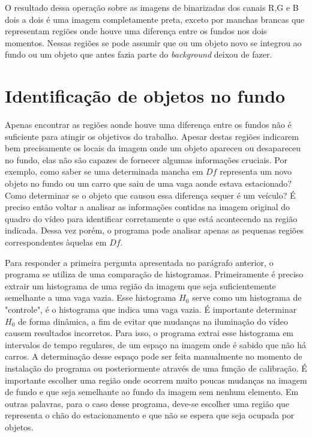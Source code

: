      O resultado dessa operação sobre as imagens de binarizadas dos canais R,G e B dois a dois é uma imagem completamente preta, exceto por manchas brancas que representam regiões onde houve uma diferença entre os fundos nos dois momentos. Nessas regiões se pode assumir que ou um objeto novo se integrou ao fundo ou um objeto que antes fazia parte do \textit{background} deixou de fazer.

\section{Identificação de objetos no fundo} \label{identificacaoFundo}

    Apenas encontrar as regiões aonde houve uma diferença entre os fundos não é suficiente para atingir os objetivos do trabalho. Apesar destas regiões indicarem bem precisamente os locais da imagem onde um objeto apareceu ou desapareceu no fundo, elas não são capazes de fornecer algumas informações cruciais. Por exemplo, como saber se uma determinada mancha em $Df$ representa um novo objeto no fundo ou um carro que saiu de uma vaga aonde estava estacionado? Como determinar se o objeto que causou essa diferença sequer é um veículo? É preciso então voltar a analisar as informações contidas na imagem original do quadro do vídeo para identificar corretamente o que está acontecendo na região indicada. Dessa vez porém, o programa pode analisar apenas as pequenas regiões correspondentes àquelas em $Df$.

    Para responder a primeira pergunta apresentada no parágrafo anterior, o programa se utiliza de uma comparação de histogramas. Primeiramente é preciso extrair um histograma de uma região da imagem que seja suficientemente semelhante a uma vaga vazia. Esse histograma $H_{0}$ serve como um histograma de "controle", é o histograma que indica uma vaga vazia. É importante determinar $H_{0}$ de forma dinâmica, a fim de evitar que mudanças na iluminação do vídeo causem resultados incorretos. Para isso, o programa extrai esse histograma em intervalos de tempo regulares, de um espaço na imagem onde é sabido que não há carros. A determinação desse espaço pode ser feita manualmente no momento de instalação do programa ou posteriormente através de uma função de calibração. É importante escolher uma região onde ocorrem muito poucas mudanças na imagem de fundo e que seja semelhante ao fundo da imagem sem nenhum elemento. Em outras palavras, para o caso desse programa, deve-se escolher uma região que representa o chão do estacionamento e que não se espera que seja ocupada por objetos.

